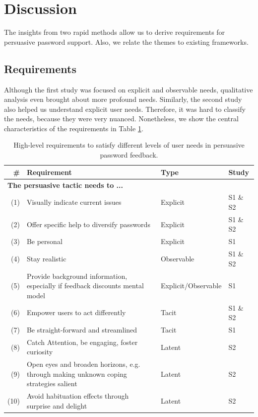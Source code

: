 \section{Discussion}
The insights from two rapid methods allow us to derive requirements for persuasive password support. Also, we relate the themes to existing frameworks. 

\subsection{Requirements}
Although the first study was focused on explicit and observable needs, qualitative analysis even brought about more profound needs. Similarly, the second study also helped us understand explicit user needs. Therefore, it was hard to classify the needs, because they were very nuanced. Nonetheless, we show the central characteristics of the requirements in Table \ref{tab:co-design:requirements}.

\begin{table}[htbp]
\begin{tabular}{rp{10cm}ll}
	\# & Requirement & Type & Study \\\hline
	\multicolumn{4}{l}{\textbf{The persuasive tactic needs to ...}} \\\hline
	(1) & Visually indicate current issues & Explicit & S1 \& S2 \\
	(2) & Offer specific help to diversify passwords & Explicit & S1 \& S2  \\		
	(3) & Be personal & Explicit & S1  \\
	(4) & Stay realistic & Observable & S1 \& S2  \\
	(5) & Provide background information, especially if feedback discounts mental model 
	& Explicit/Observable & S1 \\
	(6) & Empower users to act differently & Tacit & S1 \& S2  \\
	(7) & Be straight-forward and streamlined & Tacit & S1  \\
	(8) & Catch Attention, be engaging, foster curiosity & Latent & S2  \\	
	(9) & Open eyes and broaden horizons, e.g. through making unknown coping strategies salient & Latent & S2  \\
	(10) & Avoid habituation effects through surprise and delight & Latent & S2  \\\hline
\end{tabular}
\caption{\label{tab:co-design:requirements} High-level requirements to satisfy different levels of user needs in persuasive password feedback. }
\end{table}
\vspace*{0.5cm}

